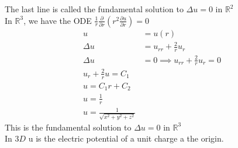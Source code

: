 \documentclass[answers, 12pts,addpoints]{exam}
\begin{document}
The last line is called the fundamental solution to $\Delta u = 0$ in $\mathbb{R}^2$\\
In $\mathbb{R}^3$, we have the ODE $\frac{1}{r} \frac{\partial }{\partial r} (r^2 \frac{\partial u}{\partial r}) = 0$\\
\begin{align*}
    u &= u(r)\\
    \Delta u &= u_{rr} + \frac{2}{r} u_r\\
    \Delta u &= 0 \implies u_{rr} + \frac{2}{r} u_r = 0\\
    u_r + \frac{2}{r} u = C_1\\
    u = C_1 r + C_2\\
    u = \frac{1}{r} \\
    u = \frac{1}{\sqrt{x^2 + y^2 + z^2}}
\end{align*}
This is the fundamental solution to $\Delta u = 0$ in $\mathbb{R}^3$\\
In $3D$ u is the electric potential of a unit charge a the origin. 
\end{document}

